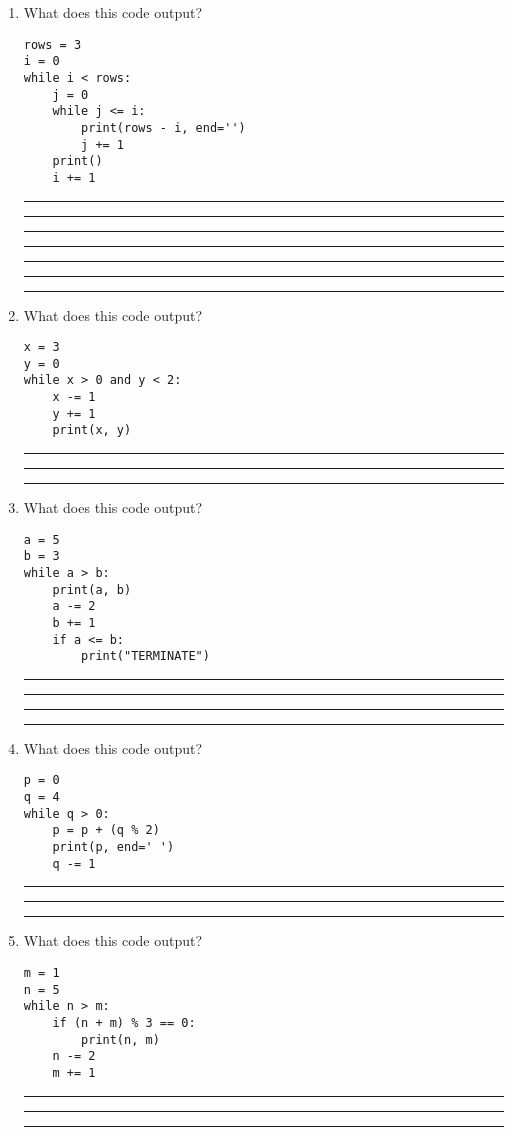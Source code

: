 \documentclass{article}
\begin{document}
\begin{enumerate}
        \item What does this code output?
        \begin{lstlisting}
rows = 3  
i = 0  
while i < rows:  
    j = 0  
    while j <= i:  
        print(rows - i, end='')  
        j += 1  
    print()  
    i += 1  
        \end{lstlisting}
        \rule{\linewidth}{0.4pt} %
        \rule{\linewidth}{0.4pt} %
        \rule{\linewidth}{0.4pt} %
        \rule{\linewidth}{0.4pt} %
        \rule{\linewidth}{0.4pt} %
        \rule{\linewidth}{0.4pt} %
        \rule{\linewidth}{0.4pt} %


    \item What does this code output?
    \begin{lstlisting}
x = 3
y = 0
while x > 0 and y < 2:
    x -= 1
    y += 1
    print(x, y)
    \end{lstlisting}
    \rule{\linewidth}{0.4pt} %
    \rule{\linewidth}{0.4pt} %
    \rule{\linewidth}{0.4pt} %

    \item What does this code output?
    \begin{lstlisting}
a = 5
b = 3
while a > b:
    print(a, b)
    a -= 2
    b += 1
    if a <= b:
        print("TERMINATE")
    \end{lstlisting}
    \rule{\linewidth}{0.4pt} %
    \rule{\linewidth}{0.4pt} %
    \rule{\linewidth}{0.4pt} %
    \rule{\linewidth}{0.4pt} %

    \item What does this code output?
    \begin{lstlisting}
p = 0
q = 4
while q > 0:
    p = p + (q % 2)
    print(p, end=' ')
    q -= 1
    \end{lstlisting}
    \rule{\linewidth}{0.4pt} %
    \rule{\linewidth}{0.4pt} %
    \rule{\linewidth}{0.4pt} %

    \item What does this code output?
    \begin{lstlisting}
m = 1
n = 5
while n > m:
    if (n + m) % 3 == 0:
        print(n, m)
    n -= 2
    m += 1
    \end{lstlisting}
    \rule{\linewidth}{0.4pt} %
    \rule{\linewidth}{0.4pt} %
    \rule{\linewidth}{0.4pt} %


\end{enumerate}
\end{document}
